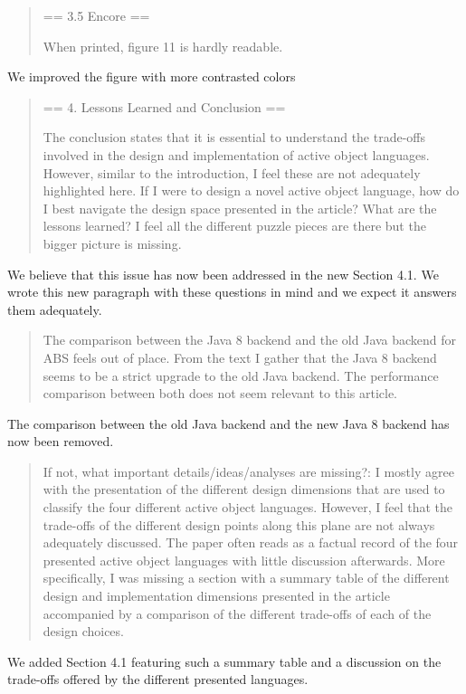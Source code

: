 \documentclass{article}
\begin{document}
\begin{quote}
== 3.5 Encore ==

When printed, figure 11 is hardly readable.
\end{quote}
	We improved the figure with more contrasted colors
	
\begin{quote}
	== 4. Lessons Learned and Conclusion ==

The conclusion states that it is essential to understand the trade-offs involved in the 
design and implementation of active object languages. However, similar to the 
introduction, I feel these are not adequately highlighted here. If I were to design a 
novel active object language, how do I best navigate the design space presented in the 
article? What are the lessons learned? I feel all the different puzzle pieces are there 
but the bigger picture is missing.
\end{quote}
We believe that this issue has now been addressed in the new Section 4.1. We wrote this 
new paragraph with these questions in mind and we expect it answers them adequately.


\begin{quote}
 The comparison between the Java 8 backend and the old Java backend 
for ABS feels out of place. From the text I gather that the Java 8 backend seems to be a 
strict upgrade to the old Java backend. The performance comparison between both does not 
seem relevant to this article.
\end{quote}
The comparison between the old Java backend and the new Java 8 backend has now been 
removed.

\begin{quote}
	If not, what important details/ideas/analyses are missing?: I mostly agree with the 
presentation of the different design dimensions that are used to classify the four 
different active object languages. However, I feel that the trade-offs of the different 
design points along this plane are not always adequately discussed. The paper often reads 
as a factual record of the four presented active object languages with little discussion 
afterwards. More specifically, I was missing a section with a summary table of the 
different design and implementation dimensions presented in the article accompanied by a 
comparison of the different trade-offs of each of the design choices.
\end{quote}
We added  Section 4.1 featuring such a summary table and a discussion on the 
trade-offs offered by the different presented languages.
\end{document}
